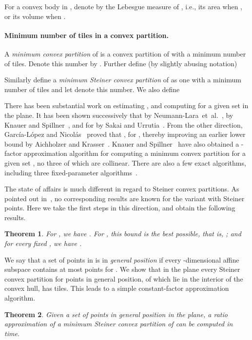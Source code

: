 \documentclass[11pt]{article}
\newtheorem{theorem}{Theorem}
\def\etal{{et~al.}}
\def\ie{{i.e.}}
\newcommand{\thmlab}[1]{{\label{theo:#1}}}
\begin{document}
For a convex body  in , denote by  the Lebesgue
measure of , \ie, its area when , or its volume when .

\paragraph{Minimum number of tiles in a convex partition.}
A {\em minimum convex partition} of  is a convex
partition of  with a minimum number of tiles. Denote this number by
.  Further define (by slightly abusing notation)

Similarly define a {\em minimum Steiner convex partition} of  as
one with a minimum number of tiles and let  denote this
number.  We also define


There has been substantial work on estimating , and computing
 for a given set  in the plane.  It has been shown
successively that  by
Neumann-Lara~\etal~\cite{NRU04},  by
Knauer and Spillner~\cite{KS06}, and  for
 by Sakai and Urrutia~\cite{SU09}.  From the other direction,
Garc\'ia-L\'opez and Nicol\'as~\cite{GN06} proved that , for , thereby improving an earlier lower
bound  by Aichholzer and Krasser~\cite{AK01}.  Knauer
and Spillner~\cite{KS06} have also obtained a -factor
approximation algorithm for computing a minimum convex partition for a
given set , no three of which are collinear. There are
also a few exact algorithms, including three fixed-parameter
algorithms~\cite{FMR01,GL05,Sp08}.

The state of affairs is much different in regard to Steiner convex
partitions.  As pointed out in~\cite{DT11}, no corresponding results
are known for the variant with Steiner points. Here we take the first
steps in this direction, and obtain the following results.

\begin{theorem}\thmlab{T1}For , we have .  For , this bound is
    the best possible, that is, ; and for
    every fixed , we have .
\end{theorem}

We say that a set of points in  is in \emph{general position}
if every -dimensional affine subspace contains at most  points
for .  We show that in the plane every Steiner convex
partition for  points in general position,  of which lie in the
interior of the convex hull, has  tiles. This
leads to a simple constant-factor approximation algorithm.

\begin{theorem} \thmlab{T2}
    Given a set  of  points in general position in the plane, a
    ratio  approximation of a minimum Steiner convex partition of
     can be computed in  time.
\end{theorem}
\end{document}
